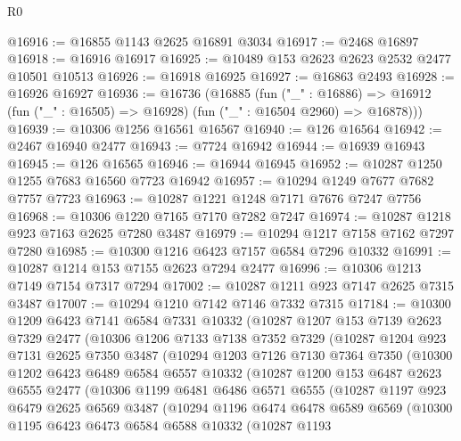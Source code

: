 \begin{lexlean}{R0}
\begin{coremodule}
@16916 := @16855 @1143 @2625 @16891 @3034
@16917 := @2468 @16897
@16918 := @16916 @16917
@16925 := @10489 @153 @2623 @2623 @2532 @2477 @10501 @10513
@16926 := @16918 @16925
@16927 := @16863 @2493
@16928 := @16926 @16927
@16936 := @16736
    (@16885
      (fun ("_" : @16886) =>
      @16912 (fun ("_" : @16505) => @16928) (fun ("_" : @16504 @2960) => @16878)))
@16939 := @10306 @1256 @16561 @16567
@16940 := @126 @16564
@16942 := @2467 @16940 @2477
@16943 := @7724 @16942
@16944 := @16939 @16943
@16945 := @126 @16565
@16946 := @16944 @16945
@16952 := @10287 @1250 @1255 @7683 @16560 @7723 @16942
@16957 := @10294 @1249 @7677 @7682 @7757 @7723
@16963 := @10287 @1221 @1248 @7171 @7676 @7247 @7756
@16968 := @10306 @1220 @7165 @7170 @7282 @7247
@16974 := @10287 @1218 @923 @7163 @2625 @7280 @3487
@16979 := @10294 @1217 @7158 @7162 @7297 @7280
@16985 := @10300 @1216 @6423 @7157 @6584 @7296 @10332
@16991 := @10287 @1214 @153 @7155 @2623 @7294 @2477
@16996 := @10306 @1213 @7149 @7154 @7317 @7294
@17002 := @10287 @1211 @923 @7147 @2625 @7315 @3487
@17007 := @10294 @1210 @7142 @7146 @7332 @7315
@17184 := @10300
    @1209
    @6423
    @7141
    @6584
    @7331
    @10332
    (@10287
      @1207
      @153
      @7139
      @2623
      @7329
      @2477
      (@10306
        @1206
        @7133
        @7138
        @7352
        @7329
        (@10287
          @1204
          @923
          @7131
          @2625
          @7350
          @3487
          (@10294
            @1203
            @7126
            @7130
            @7364
            @7350
            (@10300
              @1202
              @6423
              @6489
              @6584
              @6557
              @10332
              (@10287
                @1200
                @153
                @6487
                @2623
                @6555
                @2477
                (@10306
                  @1199
                  @6481
                  @6486
                  @6571
                  @6555
                  (@10287
                    @1197
                    @923
                    @6479
                    @2625
                    @6569
                    @3487
                    (@10294
                      @1196
                      @6474
                      @6478
                      @6589
                      @6569
                      (@10300
                        @1195
                        @6423
                        @6473
                        @6584
                        @6588
                        @10332
                        (@10287
                          @1193

\end{coremodule}
\end{lexlean}

